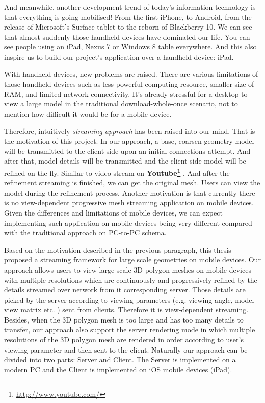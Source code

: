 \smallskip
And meanwhile, another development trend of today's information technology is that everything is going mobilised! From the first iPhone, to Android, from the release of Microsoft's Surface tablet to the reborn of Blackberry 10. We can see that almost suddenly those handheld devices have dominated our life. You can see people using an iPad, Nexus 7 or Windows 8 table everywhere. And this also inspire us to build our project's application over a handheld device: iPad. 

\smallskip
With handheld devices, new problems are raised. There are various limitations of those handheld devices such as less powerful computing resource, smaller size of RAM, and limited network connectivity. It's already stressful for a desktop to view a large model in the traditional download-whole-once scenario, not to mention how difficult it would be for a mobile device. 

\smallskip
Therefore, intuitively \emph{streaming approach} has been raised into our mind. That is the motivation of this project. In our approach, a base, coarsen geometry model will be transmitted to the client side upon an initial connections attempt. And after that, model details will be transmitted and the client-side model will be refined on the fly. Similar to video stream on \textbf{Youtube\footnote{\label{UTUBE}\url{http://www.youtube.com/}} }. And after the refinement streaming is finished, we can get the original mesh. Users can view the model during the refinement process. Another motivation is that currently there is no view-dependent progressive mesh streaming application on mobile devices. Given the differences and limitations of mobile devices, we can expect implementing such application on mobile devices being very different compared with the traditional approach on PC-to-PC schema.  

\smallskip
Based on the motivation described in the previous paragraph, this thesis proposed a streaming framework for large scale geometries on mobile devices. Our approach allows users to view large scale 3D polygon meshes on mobile devices with multiple resolutions which are continuously and progressively refined by the details streamed over network from it corresponding server. Those details are picked by the server according to viewing parameters (e.g. viewing angle, model view matrix etc. ) sent from clients. Therefore it is view-dependent streaming. Besides, when the 3D polygon mesh is too large and has too many details to transfer, our approach also support the server rendering mode in which multiple resolutions of the 3D polygon mesh are rendered in order according to user's viewing parameter and then sent to the client. Naturally our approach can be divided into two parts: Server and Client. The Server is implemented on a modern PC and the Client is implemented on iOS mobile devices (iPad).


